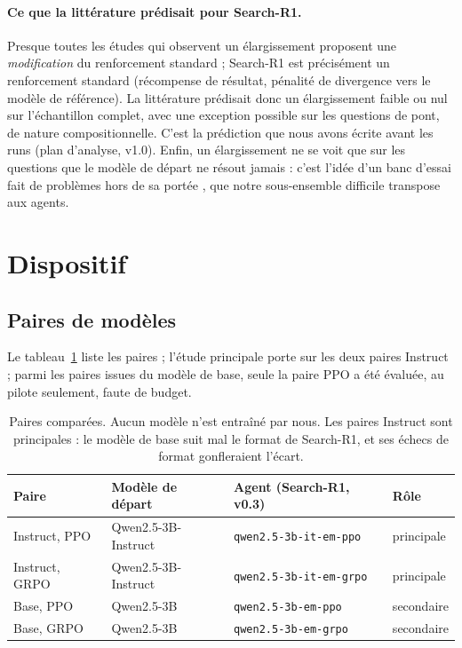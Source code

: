 \paragraph{Ce que la littérature prédisait pour Search-R1.} Presque toutes les études qui observent un élargissement proposent une \emph{modification} du renforcement standard ; Search-R1 \citep{jin2025search} est précisément un renforcement standard (récompense de résultat, pénalité de divergence vers le modèle de référence). La littérature prédisait donc un élargissement faible ou nul sur l'échantillon complet, avec une exception possible sur les questions de pont, de nature compositionnelle. C'est la prédiction que nous avons écrite avant les runs (plan d'analyse, v1.0). Enfin, un élargissement ne se voit que sur les questions que le modèle de départ ne résout jamais : c'est l'idée d'un banc d'essai fait de problèmes hors de sa portée \citep{mayilvahanan2025mathbeyond}, que notre sous-ensemble difficile transpose aux agents.

\section{Dispositif}

\subsection{Paires de modèles}

Le tableau~\ref{tab:paires} liste les paires ; l'étude principale porte sur les deux paires Instruct ; parmi les paires issues du modèle de base, seule la paire PPO a été évaluée, au pilote seulement, faute de budget.

\begin{table}[h]\centering\small
\begin{tabular}{llll}\toprule
Paire & Modèle de départ & Agent (Search-R1, v0.3) & Rôle\\\midrule
Instruct, PPO & Qwen2.5-3B-Instruct & \texttt{qwen2.5-3b-it-em-ppo} & principale\\
Instruct, GRPO & Qwen2.5-3B-Instruct & \texttt{qwen2.5-3b-it-em-grpo} & principale\\
Base, PPO & Qwen2.5-3B & \texttt{qwen2.5-3b-em-ppo} & secondaire\\
Base, GRPO & Qwen2.5-3B & \texttt{qwen2.5-3b-em-grpo} & secondaire\\\bottomrule
\end{tabular}
\caption{Paires comparées. Aucun modèle n'est entraîné par nous. Les paires Instruct sont principales : le modèle de base suit mal le format de Search-R1, et ses échecs de format gonfleraient l'écart.}
\label{tab:paires}\end{table}

